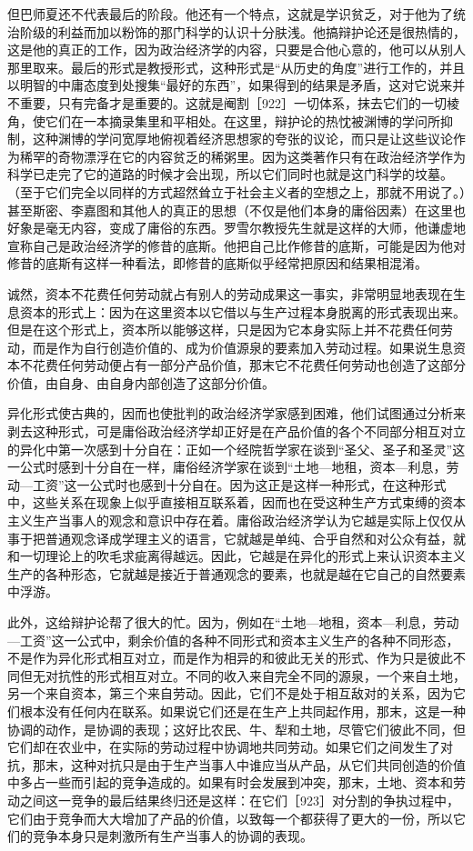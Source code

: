 但巴师夏还不代表最后的阶段。他还有一个特点，这就是学识贫乏，对于他为了统治阶级的利益而加以粉饰的那门科学的认识十分肤浅。他搞辩护论还是很热情的，这是他的真正的工作，因为政治经济学的内容，只要是合他心意的，他可以从别人那里取来。最后的形式是教授形式，这种形式是“从历史的角度”进行工作的，并且以明智的中庸态度到处搜集“最好的东西”，如果得到的结果是矛盾，这对它说来并不重要，只有完备才是重要的。这就是阉割［922］一切体系，抹去它们的一切棱角，使它们在一本摘录集里和平相处。在这里，辩护论的热忱被渊博的学问所抑制，这种渊博的学问宽厚地俯视着经济思想家的夸张的议论，而只是让这些议论作为稀罕的奇物漂浮在它的内容贫乏的稀粥里。因为这类著作只有在政治经济学作为科学已走完了它的道路的时候才会出现，所以它们同时也就是这门科学的坟墓。（至于它们完全以同样的方式超然耸立于社会主义者的空想之上，那就不用说了。）甚至斯密、李嘉图和其他人的真正的思想（不仅是他们本身的庸俗因素）在这里也好象是毫无内容，变成了庸俗的东西。罗雪尔教授先生就是这样的大师，他谦虚地宣称自己是政治经济学的修昔的底斯。他把自己比作修昔的底斯，可能是因为他对修昔的底斯有这样一种看法，即修昔的底斯似乎经常把原因和结果相混淆。

诚然，资本不花费任何劳动就占有别人的劳动成果这一事实，非常明显地表现在生息资本的形式上：因为在这里资本以它借以与生产过程本身脱离的形式表现出来。但是在这个形式上，资本所以能够这样，只是因为它本身实际上并不花费任何劳动，而是作为自行创造价值的、成为价值源泉的要素加入劳动过程。如果说生息资本不花费任何劳动便占有一部分产品价值，那末它不花费任何劳动也创造了这部分价值，由自身、由自身内部创造了这部分价值。

异化形式使古典的，因而也使批判的政治经济学家感到困难，他们试图通过分析来剥去这种形式，可是庸俗政治经济学却正好是在产品价值的各个不同部分相互对立的异化中第一次感到十分自在：正如一个经院哲学家在谈到“圣父、圣子和圣灵”这一公式时感到十分自在一样，庸俗经济学家在谈到“土地—地租，资本—利息，劳动—工资”这一公式时也感到十分自在。因为这正是这样一种形式，在这种形式中，这些关系在现象上似乎直接相互联系着，因而也在受这种生产方式束缚的资本主义生产当事人的观念和意识中存在着。庸俗政治经济学认为它越是实际上仅仅从事于把普通观念译成学理主义的语言，它就越是单纯、合乎自然和对公众有益，就和一切理论上的吹毛求疵离得越远。因此，它越是在异化的形式上来认识资本主义生产的各种形态，它就越是接近于普通观念的要素，也就是越在它自己的自然要素中浮游。

此外，这给辩护论帮了很大的忙。因为，例如在“土地—地租，资本—利息，劳动—工资”这一公式中，剩余价值的各种不同形式和资本主义生产的各种不同形态，不是作为异化形式相互对立，而是作为相异的和彼此无关的形式、作为只是彼此不同但无对抗性的形式相互对立。不同的收入来自完全不同的源泉，一个来自土地，另一个来自资本，第三个来自劳动。因此，它们不是处于相互敌对的关系，因为它们根本没有任何内在联系。如果说它们还是在生产上共同起作用，那末，这是一种协调的动作，是协调的表现；这好比农民、牛、犁和土地，尽管它们彼此不同，但它们却在农业中，在实际的劳动过程中协调地共同劳动。如果它们之间发生了对抗，那末，这种对抗只是由于生产当事人中谁应当从产品，从它们共同创造的价值中多占一些而引起的竞争造成的。如果有时会发展到冲突，那末，土地、资本和劳动之间这一竞争的最后结果终归还是这样：在它们［923］对分割的争执过程中，它们由于竞争而大大增加了产品的价值，以致每一个都获得了更大的一份，所以它们的竞争本身只是刺激所有生产当事人的协调的表现。

